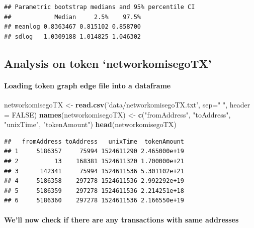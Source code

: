 \documentclass[]{article}
\newenvironment{Shaded}{\begin{snugshade}}{\end{snugshade}}
\newcommand{\KeywordTok}[1]{\textcolor[rgb]{0.13,0.29,0.53}{\textbf{#1}}}
\newcommand{\DataTypeTok}[1]{\textcolor[rgb]{0.13,0.29,0.53}{#1}}
\newcommand{\StringTok}[1]{\textcolor[rgb]{0.31,0.60,0.02}{#1}}
\newcommand{\OtherTok}[1]{\textcolor[rgb]{0.56,0.35,0.01}{#1}}
\newcommand{\NormalTok}[1]{#1}
\let\oldparagraph\paragraph
\renewcommand{\paragraph}[1]{\oldparagraph{#1}\mbox{}}
\begin{document}
\begin{verbatim}
## Parametric bootstrap medians and 95% percentile CI 
##            Median     2.5%    97.5%
## meanlog 0.8363467 0.815102 0.858700
## sdlog   1.0309188 1.014825 1.046302
\end{verbatim}

\subsection{\texorpdfstring{Analysis on token
`networkomisegoTX'}{Analysis on token networkomisegoTX}}\label{analysis-on-token-networkomisegotx}

\paragraph{Loading token graph edge file into a
dataframe}\label{loading-token-graph-edge-file-into-a-dataframe-2}

\begin{Shaded}
\begin{Highlighting}[]
\NormalTok{networkomisegoTX <-}\StringTok{ }\KeywordTok{read.csv}\NormalTok{(}\StringTok{'data/networkomisegoTX.txt'}\NormalTok{, }\DataTypeTok{sep=}\StringTok{" "}\NormalTok{, }\DataTypeTok{header =} \OtherTok{FALSE}\NormalTok{)}
\KeywordTok{names}\NormalTok{(networkomisegoTX) <-}\StringTok{ }\KeywordTok{c}\NormalTok{(}\StringTok{"fromAddress"}\NormalTok{, }\StringTok{"toAddress"}\NormalTok{, }\StringTok{"unixTime"}\NormalTok{, }\StringTok{"tokenAmount"}\NormalTok{)}
\KeywordTok{head}\NormalTok{(networkomisegoTX)}
\end{Highlighting}
\end{Shaded}

\begin{verbatim}
##   fromAddress toAddress   unixTime  tokenAmount
## 1     5186357     75994 1524611290 2.465000e+19
## 2          13    168381 1524611320 1.700000e+21
## 3      142341     75994 1524611536 5.301102e+21
## 4     5186358    297278 1524611536 2.992292e+19
## 5     5186359    297278 1524611536 2.214251e+18
## 6     5186360    297278 1524611536 2.166550e+19
\end{verbatim}

\paragraph{We'll now check if there are any transactions with same
addresses}\label{well-now-check-if-there-are-any-transactions-with-same-addresses}
\end{document}
